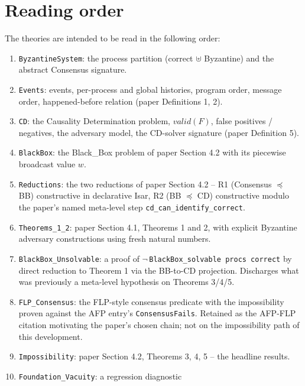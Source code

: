 \documentclass[11pt,a4paper]{article}
\begin{document}
\tableofcontents

\newpage

\section*{Reading order}

The theories are intended to be read in the following order:

\begin{enumerate}
  \item \verb|ByzantineSystem|: the process partition (correct
        $\uplus$ Byzantine) and the abstract Consensus signature.
  \item \verb|Events|: events, per-process and global histories,
        program order, message order, happened-before relation
        (paper Definitions 1, 2).
  \item \verb|CD|: the Causality Determination problem,
        $\mathit{valid}(F)$, false positives / negatives, the
        adversary model, the CD-solver signature (paper
        Definition 5).
  \item \verb|BlackBox|: the Black\_Box problem of paper Section
        4.2 with its piecewise broadcast value $w$.
  \item \verb|Reductions|: the two reductions of paper Section
        4.2 -- R1 (Consensus $\preceq$ BB) constructive in
        declarative Isar, R2 (BB $\preceq$ CD) constructive modulo
        the paper's named meta-level step
        \verb|cd_can_identify_correct|.
  \item \verb|Theorems_1_2|: paper Section 4.1, Theorems 1 and 2,
        with explicit Byzantine adversary constructions using
        fresh natural numbers.
  \item \verb|BlackBox_Unsolvable|: a proof of
        $\lnot$\,\verb|BlackBox_solvable procs correct| by direct
        reduction to Theorem 1 via the BB-to-CD projection.
        Discharges what was previously a meta-level hypothesis on
        Theorems 3/4/5.
  \item \verb|FLP_Consensus|: the FLP-style consensus predicate
        with the impossibility proven against the AFP entry's
        \verb|ConsensusFails|.  Retained as the AFP-FLP citation
        motivating the paper's chosen chain; not on the
        impossibility path of this development.
  \item \verb|Impossibility|: paper Section 4.2, Theorems 3, 4,
        5 -- the headline results.
  \item \verb|Foundation_Vacuity|: a regression diagnostic

\end{enumerate}
\end{document}
